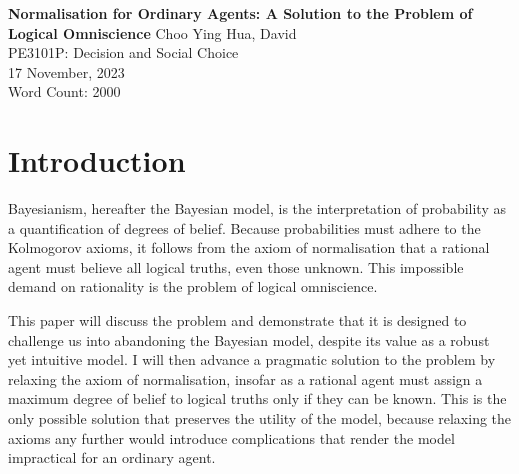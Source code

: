 \documentclass[12pt]{article}
\renewcommand{\maketitle}{%
    \begin{titlepage}
        \begin{center}
            \vfill
            \vspace*{\baselineskip}
            \vfill
            \textbf{Normalisation for Ordinary Agents: A Solution to the Problem of Logical Omniscience}
            \vfill
            Choo Ying Hua, David\\
            PE3101P: Decision and Social Choice\\
            17 November, 2023\\
            Word Count: 2000
            \vfill
        \end{center}
    \end{titlepage}
    }
\begin{document}
\maketitle
\section{Introduction}
Bayesianism, hereafter the Bayesian model, is the interpretation of probability as a quantification of degrees of belief. Because probabilities must adhere to the Kolmogorov axioms, it follows from the axiom of normalisation that a rational agent must believe all logical truths, even those unknown. This impossible demand on rationality is the problem of logical omniscience.

This paper will discuss the problem and demonstrate that it is designed to challenge us into abandoning the Bayesian model, despite its value as a robust yet intuitive model. I will then advance a pragmatic solution to the problem by relaxing the axiom of normalisation, insofar as a rational agent must assign a maximum degree of belief to logical truths only if they can be known. This is the only possible solution that preserves the utility of the model, because relaxing the axioms any further would introduce complications that render the model impractical for an ordinary agent.
\end{document}
